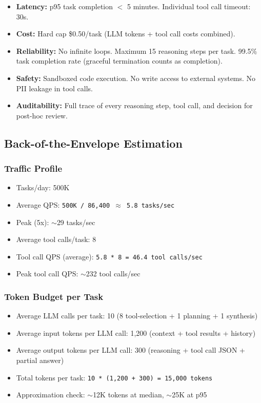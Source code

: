 \begin{itemize}
  \item \textbf{Latency:} p95 task completion $<$ 5 minutes. Individual tool call timeout: 30s.
  \item \textbf{Cost:} Hard cap \$0.50/task (LLM tokens + tool call costs combined).
  \item \textbf{Reliability:} No infinite loops. Maximum 15 reasoning steps per task. 99.5\% task completion rate (graceful termination counts as completion).
  \item \textbf{Safety:} Sandboxed code execution. No write access to external systems. No PII leakage in tool calls.
  \item \textbf{Auditability:} Full trace of every reasoning step, tool call, and decision for post-hoc review.
\end{itemize}

\subsection*{Back-of-the-Envelope Estimation}

\subsubsection*{Traffic Profile}

\begin{itemize}
  \item Tasks/day: 500K
  \item Average QPS: \texttt{500K / 86,400 $\approx$ 5.8 tasks/sec}
  \item Peak (5x): $\sim$29 tasks/sec
  \item Average tool calls/task: 8
  \item Tool call QPS (average): \texttt{5.8 * 8 = 46.4 tool calls/sec}
  \item Peak tool call QPS: $\sim$232 tool calls/sec
\end{itemize}

\subsubsection*{Token Budget per Task}

\begin{itemize}
  \item Average LLM calls per task: 10 (8 tool-selection + 1 planning + 1 synthesis)
  \item Average input tokens per LLM call: 1,200 (context + tool results + history)
  \item Average output tokens per LLM call: 300 (reasoning + tool call JSON + partial answer)
  \item Total tokens per task: \texttt{10 * (1,200 + 300) = 15,000 tokens}
  \item Approximation check: $\sim$12K tokens at median, $\sim$25K at p95
\end{itemize}

